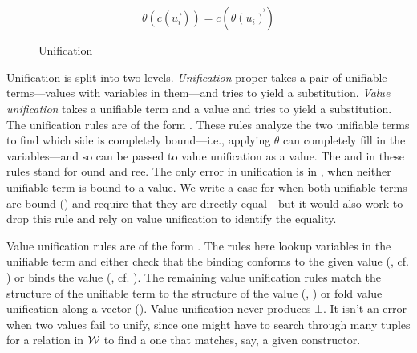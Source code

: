 \documentclass[acmsmall,screen,nonacm]{acmart}
\theoremstyle{definition}
\begin{document}
\begin{figure}[t]
  ~ \\[0.5em]


  ~ \\[0.5em]

  \sidebyside
  {
     {\theta \vdash {} \unify {} \rhd \theta{}}
  }
  {
     {\theta \vdash {} \unify {} \rhd \bot}
  }

  \[ \theta(c(\vec{u_i})) = c(\overrightarrow{\theta(u_i)}) \]

  \caption{Unification}
  \label{fig:opsem-unification}
\end{figure}

Unification is split into two levels. \emph{Unification} proper takes a pair of unifiable terms---values with variables in them---and tries to yield a substitution. \emph{Value unification} takes a unifiable term and a value and tries to yield a substitution.
%
The unification rules are of the form . These rules
analyze the two unifiable terms to find which side is completely
bound---i.e., applying $\theta$ can completely fill in the
variables---and so can be passed to value unification as a value.
%
The  and  in these rules stand for ound
and ree. The only error in unification is in , when
neither unifiable term is bound to a value.
%
We write a case for when both unifiable terms are bound ()
and require that they are directly equal---but it would also work to
drop this rule and rely on value unification to identify the equality.

Value unification rules are of the form . The rules
here lookup variables in the unifiable term and either check that the
binding conforms to the given value (,
cf. ) or binds the value (,
cf. ).
%
The remaining value unification rules match the structure of the
unifiable term to the structure of the value
(, ) or fold value unification along a
vector ().
%
Value unification never produces $\bot$. It isn't an error when two
values fail to unify, since one might have to search through many
tuples for a relation in $\mathcal{W}$ to find a one that matches, say, a
given constructor.
\end{document}
